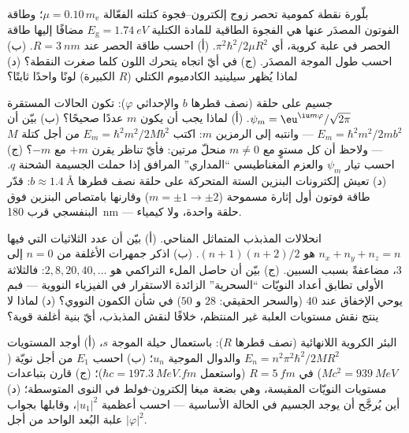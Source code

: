 \begin{exercise}[$\star$]\label{exo:b3:schrodinger-three-dimensions:4}
بلّورة نقطة كمومية تحصر زوج إلكترون--فجوة كتلته
الفعّالة $\mu = 0.10\,m_{\text{e}}$؛ وطاقة الفوتون المصدَر عنها
هي الفجوة الطاقية للمادة الكتلية $E_{\text{g}} = \qty{1.74}{eV}$ مضافًا إليها طاقة
الحصر في علبة كروية، أي $\pi^2\hbar^2/2\mu R^2$. (أ) احسب
طاقة الحصر عند $R = \qty{3}{nm}$. (ب) احسب طول الموجة المصدَر.
(ج) في أيّ اتجاه يتحرك اللون كلما صغرت النقطة؟ (د) لماذا يُظهر
سيلينيد الكادميوم الكتلي ($R$ الكبيرة) لونًا واحدًا ثابتًا؟
\end{exercise}

\begin{exercise}[$\star\star$]\label{exo:b3:schrodinger-three-dimensions:5}
جسيم على حلقة (نصف قطرها $b$ والإحداثي $\varphi$): تكون
الحالات المستقرة $\psi_m = \eu^{\iu m\varphi}/\sqrt{2\pi}$. (أ)
لماذا يجب أن يكون $m$ عددًا صحيحًا؟ (ب) بيّن أن $E_m = \hbar^2m^2/2mb^2$ ---
وانتبه إلى الرمزين $m$: اكتب $E_m = \hbar^2 m^2/2Mb^2$ من أجل كتلة
$M$ --- ولاحظ أن كل مستوٍ مع $m \neq 0$ منحلّ مرتين:
فأيّ تناظر يقرن $+m$ مع $-m$؟ (ج) احسب تيار
$\psi_m$ والعزم المغناطيسي ``المداري'' المرافق إذا حملت
الجسيمة الشحنة $q$. (د) تعيش إلكترونات البنزين الستة المتحركة
على حلقة نصف قطرها $b \approx \qty{1.4}{\angstrom}$: قدّر طاقة
فوتون أول إثارة مسموحة ($m = \pm1 \to \pm2$) وقارنها
بامتصاص البنزين فوق البنفسجي قرب \qty{180}{nm} ---
حلقة واحدة، ولا كيمياء.
\end{exercise}

\begin{exercise}[$\star\star$]\label{exo:b3:schrodinger-three-dimensions:6}
انحلالات المذبذب المتماثل المناحي. (أ) بيّن أن عدد الثلاثيات
التي فيها $n_x + n_y + n_z = n$ هو $(n+1)(n+2)/2$. (ب) اذكر
جمهرات الأغلفة من $n = 0$ إلى $3$، مضاعفةً بسبب السبين. (ج) بيّن أن
حاصل الملء التراكمي هو $2, 8, 20, 40, \dots$: فالثلاثة الأولى تطابق
أعداد النويّات ``السحرية'' الزائدة الاستقرار في الفيزياء النووية ---
فبم يوحي الإخفاق عند $40$ (والسحر الحقيقي: $28$ و $50$) في شأن
الكمون النووي؟ (د) لماذا لا ينتج نقش مستويات العلبة غير
المنتظم، خلافًا لنقش المذبذب، أيّ بنية أغلفة قوية؟
\end{exercise}

\begin{exercise}[$\star\star$]\label{exo:b3:schrodinger-three-dimensions:7}
البئر الكروية اللانهائية (نصف قطرها $R$): باستعمال حيلة الموجة $s$،
(أ) أوجد المستويات $E_n = n^2\pi^2\hbar^2/2MR^2$ والدوال
الموجية $u_n$؛ (ب) احسب $E_1$ من أجل نويّة ($Mc^2 =
\qty{939}{MeV}$) في $R = \qty{5}{fm}$ (واستعمل $\hbar c =
\qty{197.3}{MeV.fm}$)؛ (ج) قارن بتباعدات مستويات النويّات
المقيسة، وهي بضعة ميغا إلكترون-فولط في النوى المتوسطة؛ (د) أين يُرجَّح أن يوجد الجسيم
في الحالة الأساسية --- احسب أعظمية $|u_1|^2$، وقابلها
بجواب علبة البُعد الواحد من أجل $|\varphi|^2$.
\end{exercise}

